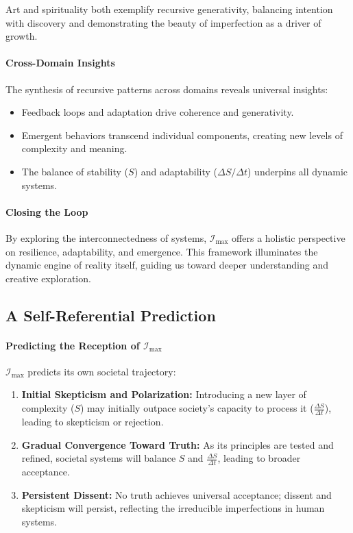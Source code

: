 \documentclass[12pt]{article}
\begin{document}
Art and spirituality both exemplify recursive generativity, balancing intention with discovery and demonstrating the beauty of imperfection as a driver of growth.

\paragraph{Cross-Domain Insights}
The synthesis of recursive patterns across domains reveals universal insights:
\begin{itemize}
    \item Feedback loops and adaptation drive coherence and generativity.
    \item Emergent behaviors transcend individual components, creating new levels of complexity and meaning.
    \item The balance of stability (\( S \)) and adaptability (\( \Delta S / \Delta t \)) underpins all dynamic systems.
\end{itemize}

\paragraph{Closing the Loop}
By exploring the interconnectedness of systems, \(\mathcal{I}_{\text{max}}\) offers a holistic perspective on resilience, adaptability, and emergence. This framework illuminates the dynamic engine of reality itself, guiding us toward deeper understanding and creative exploration.

\subsection{A Self-Referential Prediction}
\paragraph{Predicting the Reception of \(\mathcal{I}_{\text{max}}\)}
\(\mathcal{I}_{\text{max}}\) predicts its own societal trajectory:
\begin{enumerate}
    \item \textbf{Initial Skepticism and Polarization:} Introducing a new layer of complexity (\(S\)) may initially outpace society’s capacity to process it (\(\frac{\Delta S}{\Delta t}\)), leading to skepticism or rejection.
    \item \textbf{Gradual Convergence Toward Truth:} As its principles are tested and refined, societal systems will balance \(S\) and \(\frac{\Delta S}{\Delta t}\), leading to broader acceptance.
    \item \textbf{Persistent Dissent:} No truth achieves universal acceptance; dissent and skepticism will persist, reflecting the irreducible imperfections in human systems.
\end{enumerate}
\end{document}
